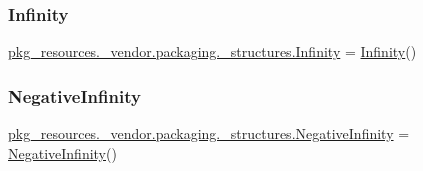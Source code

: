 \subsubsection{\texorpdfstring{Infinity}{Infinity}}
{\footnotesize\ttfamily \hyperlink{classpkg__resources_1_1__vendor_1_1packaging_1_1__structures_1_1_infinity}{pkg\+\_\+resources.\+\_\+vendor.\+packaging.\+\_\+structures.\+Infinity} = \hyperlink{classpkg__resources_1_1__vendor_1_1packaging_1_1__structures_1_1_infinity}{Infinity}()}

\mbox{\label{namespacepkg__resources_1_1__vendor_1_1packaging_1_1__structures_a26c25ea67496bc85a0593919613efc08}} 
\subsubsection{\texorpdfstring{Negative\+Infinity}{NegativeInfinity}}
{\footnotesize\ttfamily \hyperlink{classpkg__resources_1_1__vendor_1_1packaging_1_1__structures_1_1_negative_infinity}{pkg\+\_\+resources.\+\_\+vendor.\+packaging.\+\_\+structures.\+Negative\+Infinity} = \hyperlink{classpkg__resources_1_1__vendor_1_1packaging_1_1__structures_1_1_negative_infinity}{Negative\+Infinity}()}

